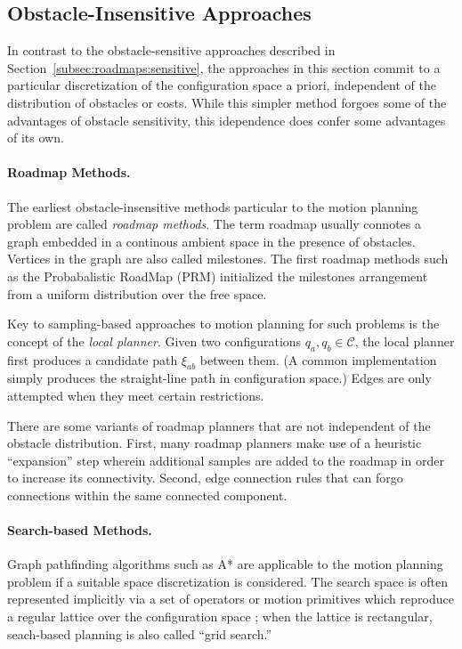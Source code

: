 

\subsection{Obstacle-Insensitive Approaches}

In contrast to the obstacle-sensitive approaches described in
Section~\ref{subsec:roadmaps:sensitive},
the approaches in this section commit to a particular discretization
of the configuration space a priori,
independent of the distribution of obstacles or costs.
While this simpler method forgoes some of the advantages of
obstacle sensitivity,
this idependence does confer some advantages of its own.

\paragraph{Roadmap Methods.}

The earliest obstacle-insensitive methods particular to the motion
planning problem are called \emph{roadmap methods}.
The term roadmap usually connotes a graph embedded in a continous
ambient space in the presence of obstacles.
Vertices in the graph are also called milestones.
The first roadmap methods such as the
Probabalistic RoadMap (PRM) \citep{kavrakietal1996prm}
initialized the milestones arrangement
from a uniform distribution over the free space.

Key to sampling-based approaches
to motion planning for such problems
is the concept of the \emph{local planner}.
Given two configurations $q_a, q_b \in \mathcal{C}$,
the local planner first produces a candidate path $\xi_{ab}$ between
them.
(A common implementation simply produces the straight-line path
in configuration space.)
Edges are only attempted when they meet certain restrictions.

There are some variants of roadmap planners that are not independent
of the obstacle distribution.
First,
many roadmap planners make use of a heuristic ``expansion'' step
wherein additional samples are added to the roadmap
in order to increase its connectivity.
Second,
edge connection rules that can forgo connections within
the same connected component.


\paragraph{Search-based Methods.}
Graph pathfinding algorithms such as A* \citep{hart1968astar}
are applicable to the motion planning problem if a suitable
space discretization is considered.
The search space is often represented implicitly via a set of
operators or motion primitives
which reproduce a regular lattice over the configuration space
\citep{pivtoraiko2005statelattice};
when the lattice is rectangular,
seach-based planning is also called ``grid search.''

